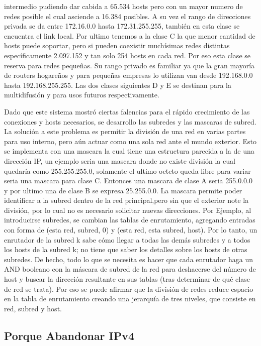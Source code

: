 \documentclass[11pt,a4paper]{article}
\begin{document}
intermedio pudiendo dar cabida a 65.534 hosts pero con un mayor numero de redes posible el cual 
asciende a 16.384 posibles. A su vez el rango de direcciones privada se da entre 172.16.0.0 hasta 
172.31.255.255, también en esta clase se encuentra el link local. Por ultimo tenemos a la clase C la
que menor cantidad de hosts puede soportar, pero si pueden coexistir muchísimas redes distintas 
específicamente 2.097.152 y tan solo 254 hosts en cada red. Por eso esta clase se reserva para redes 
pequeñas. Su rango privado es familiar ya que la gran mayoría de routers hogareños y para pequeñas 
empresas lo utilizan van desde 192.168.0.0 hasta 192.168.255.255. Las dos clases siguientes D y E se
destinan para la multidifusi\'on y para usos futuros respectivamente.\par
Dado que este sistema mostró ciertas falencias para el rápido crecimiento de las conexiones y hosts
necesarios, se desarrollo las subredes y las mascaras de subred. La solución a este problema es 
permitir la división de una red en varias partes para uso interno, pero aún actuar como una sola red 
ante el mundo exterior. Esto se implementa con una mascara la cual tiene una estructura parecida a
la de una dirección IP, un ejemplo seria una mascara donde no existe división la cual quedaría como 
255.255.255.0, solamente el ultimo octeto queda libre para variar seria una mascara para clase C. 
Entonces una mascara de clase A seria 255.0.0.0 y por ultimo una de clase B se expresa 25.255.0.0. 
La mascara permite poder identificar a la subred dentro de la red principal,pero sin que el exterior 
note la división, por lo cual no es necesario solicitar nuevas direcciones. Por Ejemplo, al 
introducirse subredes, se cambian las tablas de enrutamiento, agregando entradas con forma de (esta 
red, subred, 0) y (esta red, esta subred, host). Por lo tanto, un enrutador de la subred k sabe cómo 
llegar a todas las demás subredes y a todos los hosts de la subred k; no tiene que saber los 
detalles sobre los hosts de otras subredes. De hecho, todo lo que se necesita es hacer que cada 
enrutador haga un AND booleano con la máscara de subred de la red para deshacerse del número de host 
y buscar la dirección resultante en sus tablas (tras determinar de qué clase de red se trata). Por 
eso se puede afirmar que la división de redes reduce espacio en la tabla de enrutamiento creando una 
jerarquía de tres niveles, que consiste en red, subred y host.

\subsection{Porque Abandonar IPv4}
\end{document}

